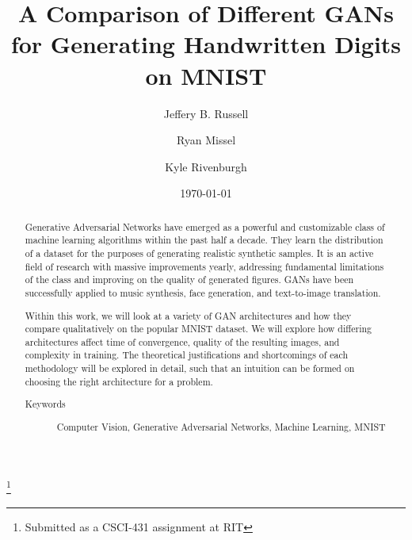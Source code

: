\documentclass[12pt,
 reprint,
 amsmath,amssymb,
 aps,
]{revtex4-2}
\begin{document}

\title{A Comparison of Different GANs for Generating Handwritten Digits on MNIST}
\thanks{Submitted as a CSCI-431 assignment at RIT}%

\author{Jeffery B. Russell}
%

\author{Ryan Missel}
%


\author{Kyle Rivenburgh}
%

\date{\today}%

\begin{abstract}
Generative Adversarial Networks have emerged as a powerful and customizable class of machine learning algorithms within the past half a decade. They learn the distribution of a dataset for the purposes of generating realistic synthetic samples. It is an active field of research with massive improvements yearly, addressing fundamental limitations of the class and improving on the quality of generated figures. GANs have been successfully applied to music synthesis, face generation, and text-to-image translation.

Within this work, we will look at a variety of GAN architectures and how they compare qualitatively on the popular MNIST dataset. We will explore how differing architectures affect time of convergence, quality of the resulting images, and complexity in training. The theoretical justifications and shortcomings of each methodology will be explored in detail, such that an intuition can be formed on choosing the right architecture for a problem.

\begin{description}
\item[Keywords]
Computer Vision, Generative Adversarial Networks, Machine Learning, MNIST
\end{description}

\end{abstract}
\maketitle
\end{document}
